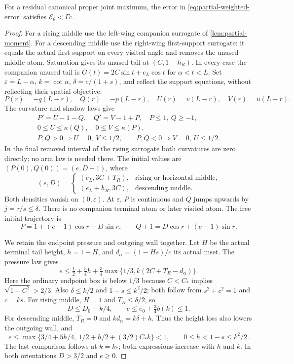 \begin{proposition}\label{app:partial-reflection}
For a residual canonical proper joint maximum, the error in
\eqref{eq:partial-weighted-error} satisfies $\mathcal E_\theta<\Gamma c$.
\end{proposition}
\begin{proof}
For a rising middle use the left-wing companion surrogate of
\cref{lem:partial-moment}. For a descending middle use the
right-wing first-support surrogate: it equals the actual first
support on every visited angle and removes the unused middle atom.
Saturation gives its unused tail at $(C,1-h_R)$.
In every case the companion unused tail is
$G(t)=2C\sin t+e_L\cos t$ for $\alpha<t<L$.
Set $\varepsilon=L-\alpha$, $ k=\cot\alpha$, $\delta=c/(1+s)$,
and reflect the support equations, without reflecting their spatial objective:
\[
 P(r)=-q(L-r),\quad Q(r)=-p(L-r),\quad
 U(r)=v(L-r),\quad V(r)=u(L-r).
\]
The curvature and shadow laws give
\begin{equation}\label{eq:partial-reflected-controls}
 \begin{gathered}
 P'=U-1-Q,\quad Q'=V-1+P,\quad P\le1,\ Q\ge-1,\\
 0\le U\le\kappa(Q),\quad0\le V\le\kappa(P),\\
 P,Q>0\Rightarrow U=0,\ V\le1/2,\qquad
 P,Q<0\Rightarrow V=0,\ U\le1/2.
 \end{gathered}
\end{equation}
In the final removed interval of the rising surrogate both
curvatures are zero directly; no arm law is needed there.
The initial values are $(P(0),Q(0))=(e,D-1)$, where
\[
 (e,D)=
 \begin{cases}
 (e_L,3C+T_R),&\text{rising or horizontal middle},\\
 (e_L+h_R,3C),&\text{descending middle}.
 \end{cases}
\]
Both densities vanish on $(0,\varepsilon)$.
At $\varepsilon$, $P$ is continuous and $Q$ jumps upwards by
$j=\tau/s\le\delta$. There is no companion terminal atom or
later visited atom. The free initial trajectory is
\[
 P=1+(e-1)\cos r-D\sin r,\qquad
 Q+1=D\cos r+(e-1)\sin r.
\]

We retain the endpoint pressure and outgoing wall together.
Let $H$ be the actual terminal tail height, $h=1-H$, and
$d_\alpha=(1-Hs)/c$ its actual inset. The pressure law gives
\[
 e\le\tfrac12+\tfrac54h+\tfrac34
      \max\{1/3, k(2C+T_R-d_\alpha)\}.
\]
Here the ordinary endpoint box is below $1/3$ because
$C<C_*$ implies $\sqrt{1-C^2}>2/3$.
Also $\delta\le k/2$ and $1-s\le k^2/2$;
both follow from $s^2+c^2=1$ and $c= k s$.
For rising middle, $H=1$ and $T_R\le\delta/2$, so
\[
 D\le D_0+ k/4,\qquad e\le e_0+\tfrac34b( k)\le1.
\]
For descending middle, $T_R=0$ and
$ k d_\alpha= k\delta+h$.
Thus the height loss also lowers the outgoing wall, and
\[
 e\le\max\{3/4+5h/4,\ 1/2+h/2+(3/2)C_* k\}<1,
 \qquad 0\le h<1-s\le k^2/2.
\]
The last comparison follows at $ k= k_*$; both expressions
increase with $h$ and $ k$.
In both orientations $D>3/2$ and $e\ge0$.


\end{proof}

